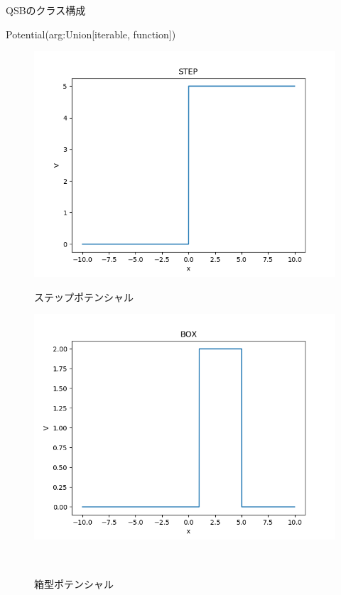 \documentclass[a4paper, lualatex]{bxjsarticle}
\begin{document}
\begin{section}{QSBのクラス構成}
\begin{subsection}{Potential(arg:Union[iterable, function])}
\begin{figure}[h]
            \begin{minipage}{0.5\hsize}
                \centering
                \includegraphics[width=0.9\hsize]{STEP.png}
                \caption{ステップポテンシャル}
            \end{minipage}
            \begin{minipage}{0.5\hsize}
                \centering
                \includegraphics[width=0.9\hsize]{BOX.png}
                \caption{箱型ポテンシャル}
            \end{minipage}\\
            \begin{minipage}{0.5\hsize}
                \centering

\end{minipage}
\end{figure}
\end{subsection}
\end{section}
\end{document}
